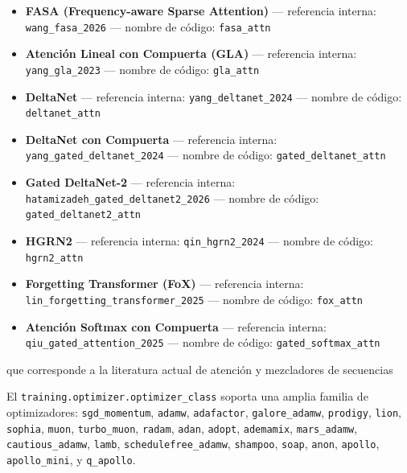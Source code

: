 \documentclass[11pt,a4paper]{article}
\begin{document}
\begin{itemize}[leftmargin=*]
    \item \textbf{FASA (Frequency-aware Sparse Attention)} --- referencia interna: \texttt{wang\_fasa\_2026} --- nombre de código: \texttt{fasa\_attn}
    \item \textbf{Atención Lineal con Compuerta (GLA)} --- referencia interna: \texttt{yang\_gla\_2023} --- nombre de código: \texttt{gla\_attn}
    \item \textbf{DeltaNet} --- referencia interna: \texttt{yang\_deltanet\_2024} --- nombre de código: \texttt{deltanet\_attn}
    \item \textbf{DeltaNet con Compuerta} --- referencia interna: \texttt{yang\_gated\_deltanet\_2024} --- nombre de código: \texttt{gated\_deltanet\_attn}
    \item \textbf{Gated DeltaNet-2} --- referencia interna: \texttt{hatamizadeh\_gated\_deltanet2\_2026} --- nombre de código: \texttt{gated\_deltanet2\_attn}
    \item \textbf{HGRN2} --- referencia interna: \texttt{qin\_hgrn2\_2024} --- nombre de código: \texttt{hgrn2\_attn}
    \item \textbf{Forgetting Transformer (FoX)} --- referencia interna: \texttt{lin\_forgetting\_transformer\_2025} --- nombre de código: \texttt{fox\_attn}
    \item \textbf{Atención Softmax con Compuerta} --- referencia interna: \texttt{qiu\_gated\_attention\_2025} --- nombre de código: \texttt{gated\_softmax\_attn}
\end{itemize}

que corresponde a la literatura actual de atención y mezcladores de secuencias \citep{sun_retentive_2023,gu_mamba_2023,zhang_continuous_2021,behrouz_titans_2025,ramapuram_theory_2024,vaswani_attention_2017,child_sparse_transformer_2019,beltagy_longformer_2020,zaheer_bigbird_2020,lou_sparsek_2024,yuan_nsa_2025,zhang_spargeattn_2025,wang_fasa_2026,yang_gla_2023,yang_deltanet_2024,yang_gated_deltanet_2024,hatamizadeh_gated_deltanet2_2026,qin_hgrn2_2024,lin_forgetting_transformer_2025,qiu_gated_attention_2025}

El \texttt{training.optimizer.optimizer\_class} soporta una amplia familia de optimizadores:
\texttt{sgd\_momentum}, \texttt{adamw}, \texttt{adafactor}, \texttt{galore\_adamw}, \texttt{prodigy}, \texttt{lion}, \texttt{sophia}, \texttt{muon}, \texttt{turbo\_muon}, \texttt{radam}, \texttt{adan}, \texttt{adopt}, \texttt{ademamix}, \texttt{mars\_adamw}, \texttt{cautious\_adamw}, \texttt{lamb}, \texttt{schedulefree\_adamw}, \texttt{shampoo}, \texttt{soap}, \texttt{anon}, \texttt{apollo}, \texttt{apollo\_mini}, y \texttt{q\_apollo}.
\end{document}
